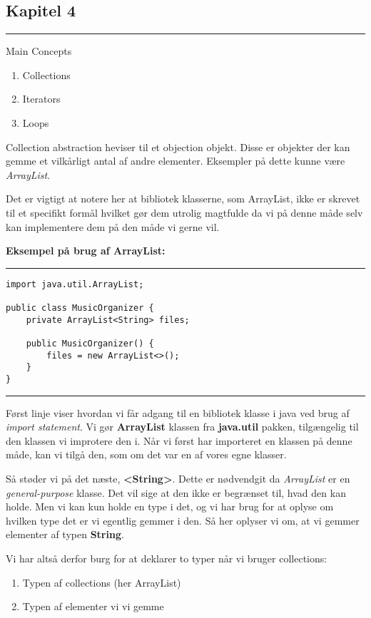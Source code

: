 \documentclass{article}
\begin{document}
\subsection*{Kapitel 4}
\hrule
\vspace{0.5em}
Main Concepts
\begin{enumerate}
    \item Collections
    \item Iterators
    \item Loops
\end{enumerate}

Collection abstraction heviser til et objection objekt. Disse er objekter der kan gemme et vilkårligt antal af andre elementer. Eksempler på dette kunne være \textit{ArrayList}.

Det er vigtigt at notere her at bibliotek klasserne, som ArrayList, ikke er skrevet til et specifikt formål hvilket gør dem utrolig magtfulde da vi på denne måde selv kan implementere dem på den måde vi gerne vil.

\noindent\textbf{Eksempel på brug af ArrayList:}

\vspace{0.3em}
\hrule
\begin{verbatim}
import java.util.ArrayList;

public class MusicOrganizer {
    private ArrayList<String> files;

    public MusicOrganizer() {
        files = new ArrayList<>();
    }
}
\end{verbatim}
\hrule \vspace{0.3em}

Først linje viser hvordan vi får adgang til en bibliotek klasse i java ved brug af \textit{import statement}. Vi gør \textbf{ArrayList} klassen fra \textbf{java.util} pakken, tilgængelig til den klassen vi improtere den i.
Når vi først har importeret en klassen på denne måde, kan vi tilgå den, som om det var en af vores egne klasser.

Så støder vi på det næste, \textbf{\textless String\textgreater}. Dette er nødvendgit da \textit{ArrayList} er en \textit{general-purpose} klasse. Det vil sige at den ikke er begrænset til, hvad den kan holde. Men vi kan kun holde en type i det, og vi har brug for at oplyse om hvilken type det er vi egentlig gemmer i den. Så her oplyser vi om, at vi gemmer elementer af typen \textbf{String}.

Vi har altså derfor burg for at deklarer to typer når vi bruger collections:
\begin{enumerate}
    \item Typen af collections (her ArrayList)
    \item Typen af elementer vi vi gemme
\end{enumerate}
\end{document}
